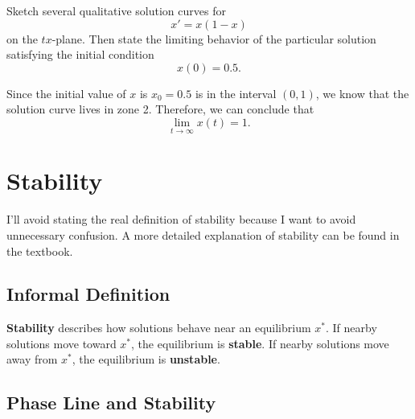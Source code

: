 \documentclass[10pt,letterpaper]{article}
\begin{document}
\begin{example}[5]{
Sketch several qualitative solution curves for
$$
x' = x(1-x)
$$
on the $tx$-plane. Then state the limiting behavior of the particular solution satisfying the initial condition
$$
x(0)=0.5.
$$
}
\begin{figure}[H]
\end{figure}
Since the initial value of $x$ is $x_0=0.5$ is in the interval $(0,1)$, we know that the solution curve lives in zone 2. Therefore, we can conclude that 
$$
\boxed{
\lim_{t\to\infty} x(t)= 1.
}
$$
\end{example}


\section{Stability}
I'll avoid stating the real definition of stability because I want to avoid unnecessary confusion. A more detailed explanation of stability can be found in the textbook.

\subsection{Informal Definition}
\textbf{Stability} describes how solutions behave near an equilibrium $x^*$. If nearby solutions move toward $x^*$, the equilibrium is \textbf{stable}.  If nearby solutions move away from $x^*$, the equilibrium is \textbf{unstable}.

\subsection{Phase Line and Stability}
\end{document}
